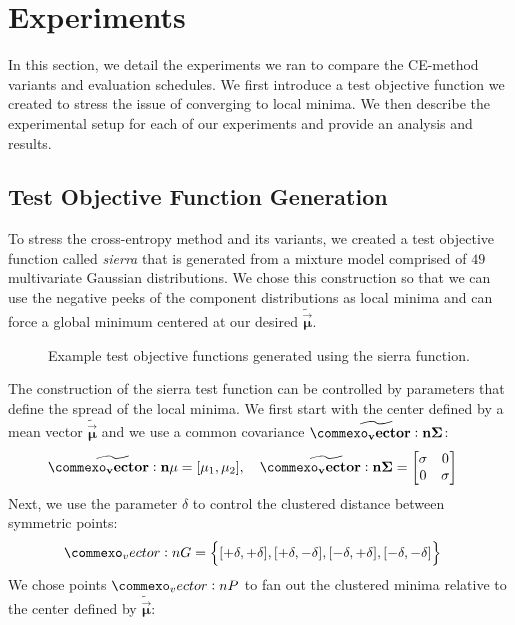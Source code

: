 

\section{Experiments} \label{sec:cem_experiments}
In this section, we detail the experiments we ran to compare the CE-method variants and evaluation schedules.
We first introduce a test objective function we created to stress the issue of converging to local minima. 
We then describe the experimental setup for each of our experiments and provide an analysis and results.


\subsection{Test Objective Function Generation}\label{sec:sierra}
To stress the cross-entropy method and its variants, we created a test objective function called \textit{sierra} that is generated from a mixture model comprised of $49$ multivariate Gaussian distributions.
We chose this construction so that we can use the negative peeks of the component distributions as local minima and can force a global minimum centered at our desired $\mathbf{\widetilde{\vec{\mu}}}$.
\begin{figure*}[!t]
  \centering
  \resizebox{0.7\textwidth}{!}{}
  \caption{
    \label{fig:sierra}
    Example test objective functions generated using the sierra function.  
  }
\end{figure*}
The construction of the sierra test function can be controlled by parameters that define the spread of the local minima.
We first start with the center defined by a mean vector $\mathbf{\widetilde{\vec{\mu}}}$ and we use a common covariance $\mathbf{\widetilde{\mat{\Sigma}}}$:
\begin{align*}
    \mathbf{\widetilde{\vec{\mu}}} &= [\mu_1, \mu_2], \quad \mathbf{\widetilde{\mat{\Sigma}}} = \begin{bmatrix}\sigma & 0\\ 0 & \sigma \end{bmatrix}
\end{align*}
Next, we use the parameter $\delta$ to control the clustered distance between symmetric points:
\begin{align*}
    \mat{G} &= \Big\{[+\delta, +\delta], [+\delta, -\delta], [-\delta, +\delta], [-\delta, -\delta]\Big\}
\end{align*}
We chose points $\mat{P}$ to fan out the clustered minima relative to the center defined by $\mathbf{\widetilde{\vec{\mu}}}$:
